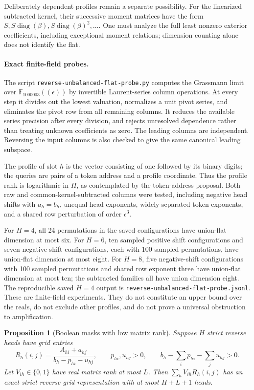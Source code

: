 \documentclass[11pt]{article}
\newtheorem{proposition}{Proposition}
\begin{document}
Deliberately dependent profiles remain a separate possibility.
For the linearized subtracted kernel, their successive moment
matrices have the form $S,S\operatorname{diag}(\beta),
S\operatorname{diag}(\beta)^2,\ldots$. One must analyze the full
least nonzero exterior coefficients, including exceptional moment
relations; dimension counting alone does not identify the flat.

\paragraph{Exact finite-field probes.}
The script \texttt{reverse-unbalanced-flat-probe.py} computes the
Grassmann limit over $\mathbb F_{1000003}((\epsilon))$ by invertible
Laurent-series column operations. At every step it divides out the
lowest valuation, normalizes a unit pivot series, and eliminates the
pivot row from all remaining columns. It reduces the available
series precision after every division, and rejects unresolved
dependence rather than treating unknown coefficients as zero.
The leading columns are independent. Reversing the input columns is
also checked to give the same canonical leading subspace.

The profile of slot $h$ is the vector consisting of one followed by
its binary digits; the queries are pairs of a token address and a
profile coordinate. Thus the profile rank is logarithmic in $H$,
as contemplated by the token-address proposal. Both raw and
common-kernel-subtracted columns were tested, including negative
head shifts with $a_h=b_h$, unequal head exponents, widely separated
token exponents, and a shared row perturbation of order
$\epsilon^3$.

For $H=4$, all 24 permutations in the saved configurations have
union-flat dimension at most six. For $H=6$, ten sampled positive
shift configurations and seven negative shift configurations, each
with 100 sampled permutations, have union-flat dimension at most
eight. For $H=8$, five negative-shift configurations with 100 sampled
permutations and shared row exponent three have union-flat dimension
at most ten; the subtracted families all have union dimension eight.
The reproducible saved $H=4$ output is
\texttt{reverse-unbalanced-flat-probe.jsonl}. These are finite-field
experiments. They do not constitute an upper bound over the reals,
do not exclude other profiles, and do not prove a universal
obstruction to amplification.

\begin{proposition}[Boolean masks with low matrix rank]
Suppose $H$ strict reverse heads have grid entries
\[
 R_h(i,j)=\frac{A_{hi}+a_{hj}}{b_h-p_{hi}-u_{hj}},
 \qquad p_{hi},u_{hj}>0,
 \qquad b_h-\sum_i p_{hi}-\sum_j u_{hj}>0.
\]
Let $V_{ih}\in\{0,1\}$ have real matrix rank at most $L$. Then
$\sum_h V_{ih}R_h(i,j)$ has an exact strict reverse grid
representation with at most $H+L+1$ heads.
\end{proposition}
\end{document}
